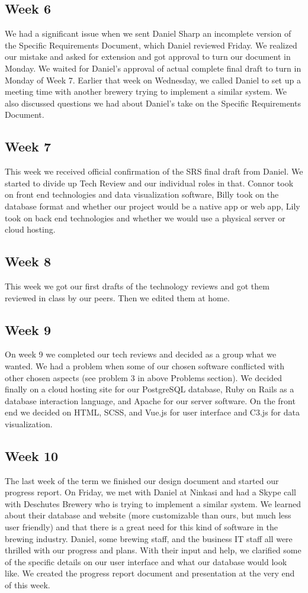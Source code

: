 \documentclass[draftclsnofoot,onecolumn,letterpaper,10pt,compsoc]{IEEEtran}
\begin{document}
\subsection{Week 6}
We had a significant issue when we sent Daniel Sharp an incomplete version of the Specific Requirements Document, which Daniel reviewed Friday.
We realized our mistake and asked for extension and got approval to turn our document in Monday.
We waited for Daniel’s approval of actual complete final draft to turn in Monday of Week 7.
Earlier that week on Wednesday, we called Daniel to set up a meeting time with another brewery trying to implement a similar system.
We also discussed questions we had about Daniel’s take on the Specific Requirements Document.

\subsection{Week 7}
This week we received official confirmation of the SRS final draft from Daniel.
We started to divide up Tech Review and our individual roles in that.
Connor took on front end  technologies and data visualization software, Billy took on the database format and whether our project would be a native app or web app, Lily took on back end technologies and whether we would use a physical server or cloud hosting.

\subsection{Week 8}
This week we got our first drafts of the technology reviews and got them reviewed in class by our peers.
Then we edited them at home.
\subsection{Week 9}
On week 9 we completed our tech reviews and decided as a group what we wanted.
We had a problem when some of our chosen software conflicted with other chosen aspects (see problem 3 in above Problems section).
We decided finally on a cloud hosting site for our PostgreSQL database, Ruby on Rails as a database interaction language, and Apache for our server software.
On the front end we decided on HTML, SCSS, and Vue.js for user interface and C3.js for data visualization.
\subsection{Week 10}
The last week of the term we finished our design document and started our progress report.
On Friday, we met with Daniel at Ninkasi and had a Skype call with Deschutes Brewery who is trying to implement a similar system.
We learned about their database and website (more customizable than ours, but much less user friendly) and that there is a great need for this kind of software in the brewing industry.
Daniel, some brewing staff, and the business IT staff all were thrilled with our progress and plans.
With their input and help, we clarified some of the specific details on our user interface and what our database would look like.
We created the progress report document and presentation at the very end of this week.
\end{document}
